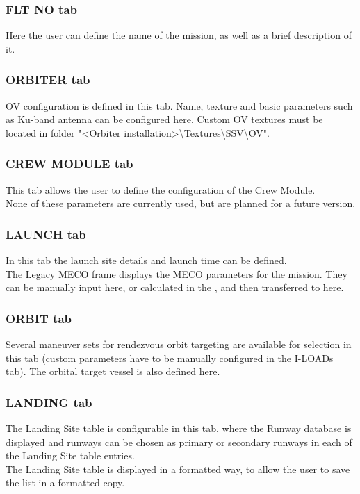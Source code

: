 \documentclass[Space_Shuttle_Vessel_Manual.tex]{subfiles}
\begin{document}
\begin{multicols*}{2}
\subsubsection{FLT NO tab}
Here the user can define the name of the mission, as well as a brief description of it.


\subsubsection{ORBITER tab}
OV configuration is defined in this tab. Name, texture and basic parameters such as Ku-band antenna can be configured here.
Custom OV textures must be located in folder "<Orbiter installation>\textbackslash Textures\textbackslash SSV\textbackslash OV".


\subsubsection{CREW MODULE tab}
This tab allows the user to define the configuration of the Crew Module.\\
None of these parameters are currently used, but are planned for a future version.


\subsubsection{LAUNCH tab}
In this tab the launch site details and launch time can be defined.\\
The Legacy MECO frame displays the MECO parameters for the mission. They can be manually input here, or calculated in the , and then transferred to here.


\subsubsection{ORBIT tab}
Several maneuver sets for rendezvous orbit targeting are available for selection in this tab (custom parameters have to be manually configured in the I-LOADs tab). The orbital target vessel is also defined here.


\subsubsection{LANDING tab}
The Landing Site table is configurable in this tab, where the Runway database is displayed and runways can be chosen as primary or secondary runways in each of the Landing Site table entries.\\
The Landing Site table is displayed in a formatted way, to allow the user to save the list in a formatted copy.



\end{multicols*}
\end{document}
